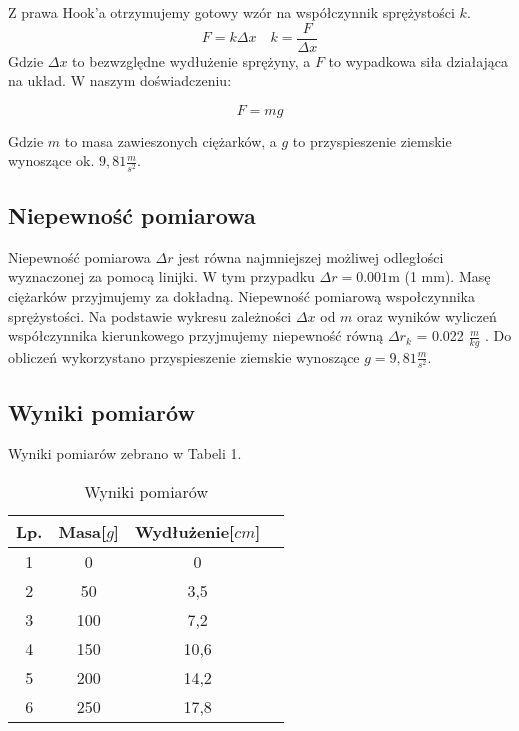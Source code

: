 \documentclass{article} %
\begin{document}
Z prawa Hook'a otrzymujemy gotowy wzór na współczynnik sprężystości $k$.
{\large
\begin{equation}
    F = k\Delta x
    \quad
    k = \frac{F}{\Delta x}
\end{equation}
}
Gdzie $\Delta x$ to bezwzględne wydłużenie sprężyny, a $F$ to wypadkowa siła działająca na układ. W naszym doświadczeniu:

{\large
\begin{equation}
    F = mg
\end{equation}
}

Gdzie $m$ to masa zawieszonych ciężarków, a $g$ to przyspieszenie ziemskie wynoszące ok. $9,81\frac{m}{s^2}$.

\subsection{Niepewność pomiarowa}

Niepewność pomiarowa $\Delta r$ jest równa najmniejszej możliwej odległości wyznaczonej za pomocą linijki. W tym przypadku $\Delta r = 0.001$m (1 mm). Masę ciężarków przyjmujemy za dokładną. Niepewność pomiarową wspołczynnika sprężystości. Na podstawie wykresu zależności $\Delta x$ od $m$ oraz wyników wyliczeń współczynnika kierunkowego przyjmujemy niepewność równą $\Delta r_k$ = 0.022 $\frac{m}{kg}$ . Do obliczeń wykorzystano przyspieszenie ziemskie wynoszące $g= 9,81\frac{m}{s^2}$.

\subsection{Wyniki pomiarów}

Wyniki pomiarów zebrano w Tabeli 1.
\begin{table}[h!]
\centering
\begin{tabular}{|c|c|c|c|}
\hline
\textbf{Lp.} & \textbf{Masa[$g$]} & \textbf{Wydłużenie[$cm$]}\\
\hline
1 & 0 & 0\\
2 & 50 & 3,5\\
3 & 100 & 7,2\\
4 & 150 & 10,6\\
5 & 200 & 14,2\\
6 & 250 & 17,8\\
\hline
\end{tabular}
\caption{Wyniki pomiarów}
\label{table:students}
\end{table}
\end{document}
